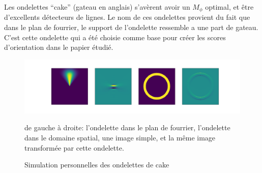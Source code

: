 \documentclass{article}
\begin{document}
Les ondelettes ``cake'' (gateau en anglais) s'avèrent avoir un $ M_{\phi} $ optimal, et
être d'excellents détecteurs de lignes. Le nom de ces ondelettes provient du fait que
dans le plan de fourrier, le support de l'ondelette ressemble a une part de gateau.
C'est cette ondelette qui a été choisie comme base pour créer les scores d'orientation
dans le papier étudié.
\vspace{5em}
\begin{figure}[htpb]
\centering
\hspace*{-6em}
\includegraphics[scale=0.39]{plots/cake_wavelet.png}
\caption {Simulation personnelles des ondelettes de  cake}
de gauche à droite: l'ondelette dans le plan de fourrier, l'ondelette dans le domaine
spatial, une image simple, et la même image transformée par cette ondelette.
\end{figure}
\end{document}
